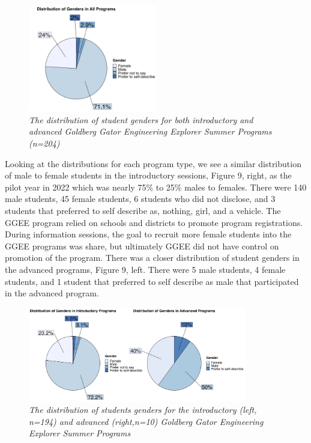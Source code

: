 \documentclass[
]{article}
\begin{document}
\begin{figure}
\centering
\includegraphics[width=0.5\textwidth,height=\textheight]{Graphs/Report/GGEE_23_Gender_All.jpg}
\caption{\emph{The distribution of student genders for both introductory
and advanced Goldberg Gator Engineering Explorer Summer Programs
(n=204)}}
\end{figure}

Looking at the distributions for each program type, we see a similar
distribution of male to female students in the introductory sessions,
Figure 9, right, as the pilot year in 2022 which was nearly 75\% to 25\%
males to females. There were 140 male students, 45 female students, 6
students who did not disclose, and 3 students that preferred to self
describe as, nothing, girl, and a vehicle. The GGEE program relied on
schools and districts to promote program registrations. During
information sessions, the goal to recruit more female students into the
GGEE programs was share, but ultimately GGEE did not have control on
promotion of the program. There was a closer distribution of student
genders in the advanced programs, Figure 9, left. There were 5 male
students, 4 female students, and 1 student that preferred to self
describe as male that participated in the advanced program.

\begin{figure}
\centering
\includegraphics[width=0.85\textwidth,height=\textheight]{Graphs/Report/GGEE_23_Gender_IA.jpg}
\caption{\emph{The distribution of students genders for the introductory
(left, n=194) and advanced (right,n=10) Goldberg Gator Engineering
Explorer Summer Programs}}
\end{figure}
\end{document}
